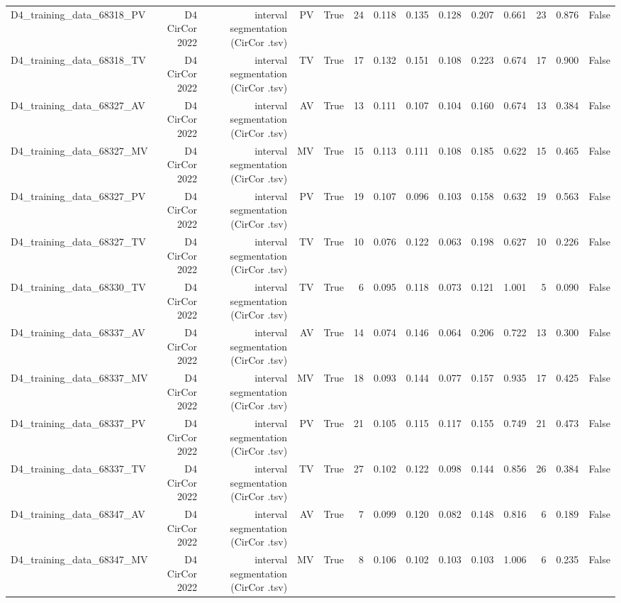 \begin{table}[htbp]
\begin{tabular}{lrrrrrrrrrrrrr}
    D4\_training\_data\_68318\_PV & D4 CirCor 2022 & interval segmentation (CirCor .tsv) & PV & True & 24 & 0.118 & 0.135 & 0.128 & 0.207 & 0.661 & 23 & 0.876 & False \\
    D4\_training\_data\_68318\_TV & D4 CirCor 2022 & interval segmentation (CirCor .tsv) & TV & True & 17 & 0.132 & 0.151 & 0.108 & 0.223 & 0.674 & 17 & 0.900 & False \\
    D4\_training\_data\_68327\_AV & D4 CirCor 2022 & interval segmentation (CirCor .tsv) & AV & True & 13 & 0.111 & 0.107 & 0.104 & 0.160 & 0.674 & 13 & 0.384 & False \\
    D4\_training\_data\_68327\_MV & D4 CirCor 2022 & interval segmentation (CirCor .tsv) & MV & True & 15 & 0.113 & 0.111 & 0.108 & 0.185 & 0.622 & 15 & 0.465 & False \\
    D4\_training\_data\_68327\_PV & D4 CirCor 2022 & interval segmentation (CirCor .tsv) & PV & True & 19 & 0.107 & 0.096 & 0.103 & 0.158 & 0.632 & 19 & 0.563 & False \\
    D4\_training\_data\_68327\_TV & D4 CirCor 2022 & interval segmentation (CirCor .tsv) & TV & True & 10 & 0.076 & 0.122 & 0.063 & 0.198 & 0.627 & 10 & 0.226 & False \\
    D4\_training\_data\_68330\_TV & D4 CirCor 2022 & interval segmentation (CirCor .tsv) & TV & True & 6 & 0.095 & 0.118 & 0.073 & 0.121 & 1.001 & 5 & 0.090 & False \\
    D4\_training\_data\_68337\_AV & D4 CirCor 2022 & interval segmentation (CirCor .tsv) & AV & True & 14 & 0.074 & 0.146 & 0.064 & 0.206 & 0.722 & 13 & 0.300 & False \\
    D4\_training\_data\_68337\_MV & D4 CirCor 2022 & interval segmentation (CirCor .tsv) & MV & True & 18 & 0.093 & 0.144 & 0.077 & 0.157 & 0.935 & 17 & 0.425 & False \\
    D4\_training\_data\_68337\_PV & D4 CirCor 2022 & interval segmentation (CirCor .tsv) & PV & True & 21 & 0.105 & 0.115 & 0.117 & 0.155 & 0.749 & 21 & 0.473 & False \\
    D4\_training\_data\_68337\_TV & D4 CirCor 2022 & interval segmentation (CirCor .tsv) & TV & True & 27 & 0.102 & 0.122 & 0.098 & 0.144 & 0.856 & 26 & 0.384 & False \\
    D4\_training\_data\_68347\_AV & D4 CirCor 2022 & interval segmentation (CirCor .tsv) & AV & True & 7 & 0.099 & 0.120 & 0.082 & 0.148 & 0.816 & 6 & 0.189 & False \\
    D4\_training\_data\_68347\_MV & D4 CirCor 2022 & interval segmentation (CirCor .tsv) & MV & True & 8 & 0.106 & 0.102 & 0.103 & 0.103 & 1.006 & 6 & 0.235 & False \\

\end{tabular}
\end{table}
